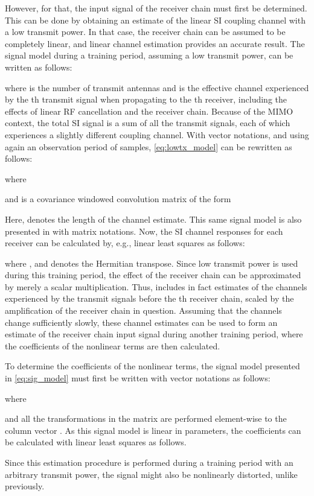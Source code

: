 \documentclass[conference,twoside,letterpaper,10pt]{IEEEtran}
\begin{document}
However, for that, the input signal of the receiver chain must first be determined. This can be done by obtaining an estimate of the linear SI coupling channel with a low transmit power. In that case, the receiver chain can be assumed to be completely linear, and linear channel estimation provides an accurate result. The signal model during a training period, assuming a low transmit power, can be written as follows:

where  is the number of transmit antennas and  is the effective channel experienced by the th transmit signal  when propagating to the th receiver, including the effects of linear RF cancellation and the receiver chain. Because of the MIMO context, the total SI signal is a sum of all the transmit signals, each of which experiences a slightly different coupling channel. With vector notations, and using again an observation period of  samples, \eqref{eq:lowtx_model} can be rewritten as follows:

where

and  is a covariance windowed convolution matrix of the form

Here,  denotes the length of the channel estimate. This same signal model is also presented in \cite{Riihonen12} with matrix notations. Now, the SI channel responses for each receiver can be calculated by, e.g., linear least squares as follows:

where , and  denotes the Hermitian transpose. Since low transmit power is used during this training period, the effect of the receiver chain can be approximated by merely a scalar multiplication. Thus,  includes in fact estimates of the channels experienced by the transmit signals before the th receiver chain, scaled by the amplification of the receiver chain in question. Assuming that the channels change sufficiently slowly, these channel estimates can be used to form an estimate of the receiver chain input signal during another training period, where the coefficients of the nonlinear terms are then calculated.

To determine the coefficients of the nonlinear terms, the signal model presented in \eqref{eq:sig_model} must first be written with vector notations as follows:

where

and all the transformations in the matrix  are performed element-wise to the column vector . As this signal model is linear in parameters, the coefficients  can be calculated with linear least squares as follows.

Since this estimation procedure is performed during a training period with an arbitrary transmit power, the signal  might also be nonlinearly distorted, unlike previously.
\end{document}
